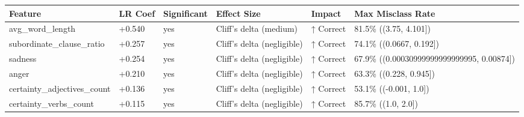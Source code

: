 \begin{tabular}{llllll}
\toprule
Feature & LR Coef & Significant & Effect Size & Impact & Max Misclass Rate \\
\midrule
avg\_word\_length & +0.540 & yes & Cliff's delta (medium) & ↑ Correct & 81.5\% ((3.75, 4.101]) \\
subordinate\_clause\_ratio & +0.257 & yes & Cliff's delta (negligible) & ↑ Correct & 74.1\% ((0.0667, 0.192]) \\
sadness & +0.254 & yes & Cliff's delta (negligible) & ↑ Correct & 67.9\% ((0.00030999999999999995, 0.00874]) \\
anger & +0.210 & yes & Cliff's delta (negligible) & ↑ Correct & 63.3\% ((0.228, 0.945]) \\
certainty\_adjectives\_count & +0.136 & yes & Cliff's delta (negligible) & ↑ Correct & 53.1\% ((-0.001, 1.0]) \\
certainty\_verbs\_count & +0.115 & yes & Cliff's delta (negligible) & ↑ Correct & 85.7\% ((1.0, 2.0]) \\
\bottomrule
\end{tabular}
